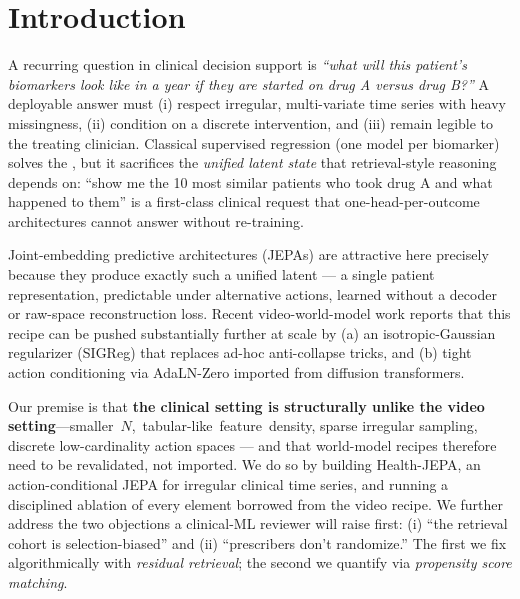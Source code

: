 \section{Introduction}

A recurring question in clinical decision support is \emph{``what will this
patient's biomarkers look like in a year if they are started on drug A
versus drug B?''} A deployable answer must (i) respect irregular,
multi-variate time series with heavy missingness, (ii) condition on a
discrete intervention, and (iii) remain legible to the treating clinician.
Classical supervised regression (one model per biomarker) solves the
\predictiontask, but it sacrifices the \emph{unified latent state} that
retrieval-style reasoning depends on: ``show me the 10 most similar
patients who took drug A and what happened to them'' is a first-class
clinical request that one-head-per-outcome architectures cannot answer
without re-training.

Joint-embedding predictive architectures (JEPAs) \citep{assran2023ijepa}
are attractive here precisely because they produce exactly such a unified
latent --- a single patient representation, predictable under alternative
actions, learned without a decoder or raw-space reconstruction loss.
Recent video-world-model work \citep{balestriero2025lejepa,
maes2026leworldmodel} reports that this recipe can be pushed substantially
further at scale by (a) an isotropic-Gaussian regularizer (SIGReg) that
replaces ad-hoc anti-collapse tricks, and (b) tight action conditioning
via AdaLN-Zero \citep{peebles2023dit} imported from diffusion transformers.

Our premise is that \textbf{the clinical setting is structurally unlike
the video setting}\mbox{---smaller $N$, tabular-like feature density}, sparse
irregular sampling, discrete low-cardinality action spaces --- and that
world-model recipes therefore need to be revalidated, not imported. We do
so by building Health-JEPA, an action-conditional JEPA for irregular
clinical time series, and running a disciplined ablation of every element
borrowed from the video recipe. We further address the two objections a
clinical-ML reviewer will raise first: (i) ``the retrieval cohort is
selection-biased'' and (ii) ``prescribers don't randomize.'' The first we
fix algorithmically with \emph{residual retrieval}; the second we
quantify via \emph{propensity score matching}.

